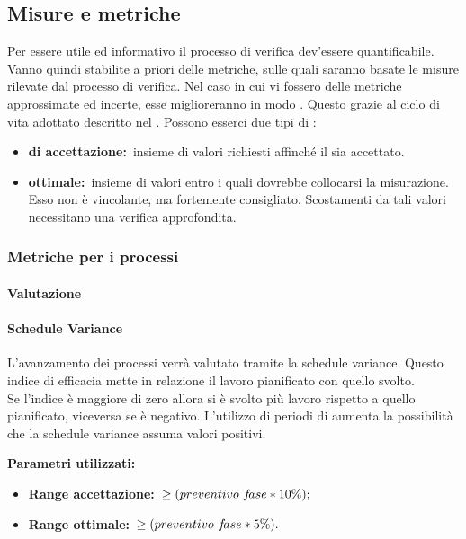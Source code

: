 	\subsection{Misure e metriche}
	\label{sec:3.7}
		Per essere utile ed informativo il processo di verifica dev'essere quantificabile. Vanno quindi stabilite a priori delle metriche, sulle quali saranno basate le misure rilevate dal processo di verifica. Nel caso in cui vi fossero delle metriche approssimate ed incerte, esse miglioreranno in modo . Questo grazie al ciclo di vita adottato descritto nel \PPdoc. Possono esserci due tipi di :
		\begin{itemize}
			\item \textbf{ di accettazione:}\ insieme di valori richiesti affinché il  sia accettato.
			\item \textbf{ ottimale:}\ insieme di valori entro i quali dovrebbe collocarsi la misurazione. Esso non è vincolante, ma fortemente consigliato. Scostamenti da tali valori necessitano una verifica approfondita.
		\end{itemize}
		\subsubsection{Metriche per i processi}
		\label{sec:3.7.1}
			\paragraph{Valutazione }
			\paragraph{Schedule Variance}
			\label{sec:3.7.1.1}
				L'avanzamento dei processi verrà valutato tramite la schedule variance. Questo indice di efficacia mette in relazione il lavoro pianificato con quello svolto. \\
				Se l'indice è maggiore di zero allora si è svolto più lavoro rispetto a quello pianificato, viceversa se è negativo. L'utilizzo di periodi di  aumenta la possibilità che la schedule variance assuma valori positivi.
				
				\textbf{Parametri utilizzati:}
				\begin{itemize}
					\item \textbf{Range accettazione:}\ $\ge\-(preventivo\,\, f\!ase*10\%);$
					\item \textbf{Range ottimale:}\ $\ge\-(preventivo\,\, f\!ase*5\%).$
				\end{itemize}
